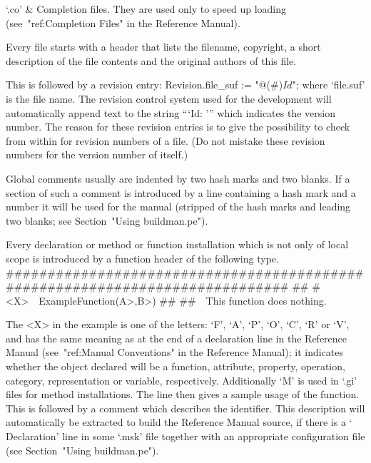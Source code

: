 `.co' &
    Completion files.
    They are used only to speed up loading
    (see~"ref:Completion Files" in the Reference Manual).
\enditems


Every file starts with a header that lists the filename, copyright, a short
description of the file contents and the original authors of this file.

This is followed by a revision entry:
\begintt
Revision.file_suf :=
    "@(#)$Id$";
\endtt
where `file.suf' is the file name. The revision control system used for the
development will automatically append text to the string ``{`Id: '}'' which
indicates the version number. The reason for these revision entries is to
give the possibility to check from within {\GAP} for revision numbers of a
file. (Do not mistake these revision numbers for the version number of
{\GAP} itself.)

Global comments usually are indented by two hash marks and two blanks.
If a section of such a comment is introduced by a line containing
a hash mark and a number it will be used for the manual
(stripped of the hash marks and leading two blanks; see
Section~"Using buildman.pe").

Every declaration or method or function installation which is not only of
local scope is introduced by a function header of the following type.
\)\#\#\#\#\#\#\#\#\#\#\#\#\#\#\#\#\#\#\#\#\#\#\#\#\#\#\#\#\#\#\#\#\#\#\#\#\#\#\#\#\#\#\#\#\#\#\#\#\#\#\#\#\#\#\#\#\#\#\#\#\#\#\#\#\#\#\#\#\#\#\#\#\#\#\#\#\#
\)\#\#
\)\#<X>\ \ ExampleFunction(\<A>,\<B>)
\)\#\#
\)\#\#\ \ This function does nothing.

The <X> in the example is one of the letters: `F', `A', `P', `O',
`C', `R' or `V', and has the same meaning as at the end
of a declaration line in the Reference Manual (see~"ref:Manual Conventions"
in the Reference Manual);
it indicates whether the object declared will be a function, attribute,
property, operation, category, representation or variable, respectively.
Additionally `M' is used in `.gi' files for method installations.
The line then gives a sample usage of the function.
This is followed by a comment which describes the identifier.
This description will automatically be extracted to build the
Reference Manual source, if there is a `\\Declaration' line in some
`.msk' file together with an appropriate configuration file (see
Section~"Using buildman.pe").

